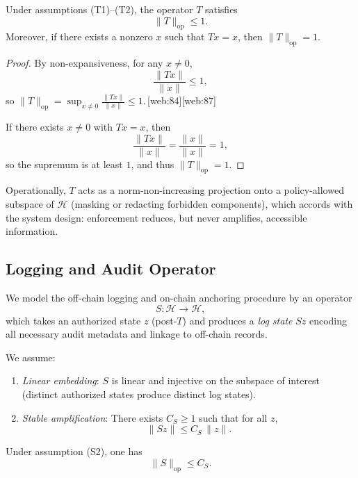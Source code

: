 \documentclass[11pt]{article}
\begin{document}
\begin{proposition}
\label{prop:T-norm}
Under assumptions \textnormal{(T1)}--\textnormal{(T2)}, the operator $T$ satisfies
\[
  \|T\|_{\mathrm{op}} \le 1.
\]
Moreover, if there exists a nonzero $x$ such that $T x = x$, then $\|T\|_{\mathrm{op}} = 1$.
\end{proposition}

\begin{proof}
By non-expansiveness, for any $x \neq 0$,
\[
  \frac{\|T x\|}{\|x\|} \le 1,
\]
so $\|T\|_{\mathrm{op}} = \sup_{x \neq 0} \frac{\|T x\|}{\|x\|} \le 1$.\,[web:84][web:87]

If there exists $x \neq 0$ with $T x = x$, then
\[
  \frac{\|T x\|}{\|x\|} = \frac{\|x\|}{\|x\|} = 1,
\]
so the supremum is at least $1$, and thus $\|T\|_{\mathrm{op}} = 1$.
\end{proof}

Operationally, $T$ acts as a norm-non-increasing projection onto a policy-allowed subspace of $\mathcal{H}$ (masking or redacting forbidden components), which accords with the system design: enforcement reduces, but never amplifies, accessible information.

\subsection{Logging and Audit Operator}

We model the off-chain logging and on-chain anchoring procedure by an operator
\[
  S : \mathcal{H} \to \mathcal{H},
\]
which takes an authorized state $z$ (post-$T$) and produces a \emph{log state} $S z$ encoding all necessary audit metadata and linkage to off-chain records.

We assume:

\begin{enumerate}[label=(S\arabic*), nosep]
  \item \emph{Linear embedding}: $S$ is linear and injective on the subspace of interest (distinct authorized states produce distinct log states).
  \item \emph{Stable amplification}: There exists $C_S \ge 1$ such that for all $z$,
  \[
    \|S z\| \le C_S \, \|z\|.
  \]
\end{enumerate}

\begin{proposition}
\label{prop:S-norm}
Under assumption \textnormal{(S2)}, one has
\[
  \|S\|_{\mathrm{op}} \le C_S.
\]
\end{proposition}
\end{document}
